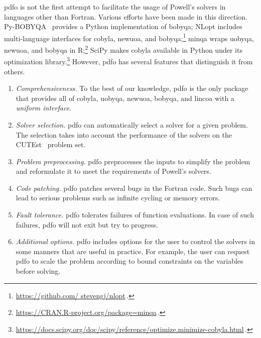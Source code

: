 \documentclass[manuscript,screen,review]{acmart}
\numberwithin{equation}{section}
\begin{document}
\Gls{pdfo} is not the first attempt to facilitate the usage of Powell's solvers in languages other than Fortran.
Various efforts have been made in this direction.
Py-BOBYQA~\cite{Cartis_Etal_2019,Cartis_Roberts_Sheridan-Methven_2022} provides a Python implementation of \gls{bobyqa}; NLopt includes multi-language interfaces for \gls{cobyla}, \gls{newuoa}, and \gls{bobyqa};\footnote{\url{https://github.com/ stevengj/nlopt}\,.} minqa wraps \gls{uobyqa}, \gls{newuoa}, and \gls{bobyqa} in R;\footnote{\url{https://CRAN.R-project.org/package=minqa}\,.} SciPy makes \gls{cobyla} available in Python under its optimization library.\footnote{\url{https://docs.scipy.org/doc/scipy/reference/optimize.minimize-cobyla.html}\,.}
However, \gls{pdfo} has several features that distinguish it from others.
\begin{enumerate}
    \item \emph{Comprehensiveness.}
    To the best of our knowledge, \gls{pdfo} is the only package that provides all of \gls{cobyla}, \gls{uobyqa}, \gls{newuoa}, \gls{bobyqa}, and \gls{lincoa} with a \emph{uniform interface}.

    \item \emph{Solver selection.}
    \Gls{pdfo} can automatically select a solver for a given problem.
    The selection takes into account the performance of the solvers on the CUTEst~\cite{Gould_Orban_Toint_2015} problem set.

    \item \emph{Problem preprocessing.}
    \Gls{pdfo} preprocesses the inputs to simplify the problem and reformulate it to meet the requirements of Powell's solvers.

    \item \emph{Code patching.}
    \Gls{pdfo} patches several bugs in the Fortran code.
    Such bugs can lead to serious problems such as infinite cycling or memory errors.

    \item \emph{Fault tolerance.}
    \Gls{pdfo} tolerates failures of function evaluations.
    In case of such failures, \gls{pdfo} will not exit but try to progress.

    \item \emph{Additional options.}
    \Gls{pdfo} includes options for the user to control the solvers in some manners that are useful in practice.
    For example, the user can request \gls{pdfo} to scale the problem according to bound constraints on the variables before solving.
\end{enumerate}
\end{document}
